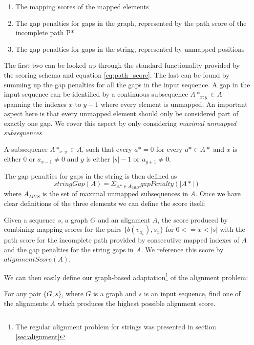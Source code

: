 \documentclass[thesis.tex]{subfiles}
\begin{document}
{\begin{enumerate}
  \item The mapping scores of the mapped elements
  \item The gap penalties for gaps in the graph, represented by the path score of the incomplete path P*
  \item The gap penalties for gaps in the string, represented by unmapped positions
\end{enumerate}
The first two can be looked up through the standard functionality provided by the scoring schema and equation \ref{eq:path_score}. The last can be found by summing up the gap penalties for all the gaps in the input sequence. A gap in the input sequence can be identified by a continuous subsequence $A*_{x:y} \in A$ spanning the indexes $x$ to $y-1$ where every element is unmapped. An important aspect here is that every unmapped element should only be considered part of exactly one gap. We cover this aspect by only considering \textit{maximal unmapped subsequences}
\begin{defn}
  A subsequence $A*_{x:y} \in A$, such that every $a*=0$ for every $a* \in A*$ and $x$ is either $0$ or $a_{x-1} \neq 0$ and $y$ is either $|s|-1$ or $a_{y+1} \neq 0$.
\end{defn}
The gap penalties for gaps in the string is then defined as 
\begin{equation}
  stringGap(A)=\Sigma_{A* \in A_{MUS}} gapPenalty(|A*|)
\end{equation}
where $A_{MUS}$ is the set of maximal unmapped subsequences in $A$. Once we have clear definitions of the three elements we can define the score itself:
\begin{defn}
  Given a sequence $s$, a graph $G$ and an alignment $A$, the score produced by combining mapping scores for the pairs $\{b(v_{a_x}), s_x\}$ for $0<=x<|s|$ with the path score for the incomplete path provided by consecutive mapped indexes of $A$ and the gap penalties for the string gaps in $A$. We reference this score by $alignmentScore(A)$.
\end{defn}
We can then easily define our graph-based adaptation\footnote{The regular alignment problem for strings was presented in section \ref{sec:alignment}} of the alignment problem:
\begin{defn}
  For any pair $\{G, s\}$, where $G$ is a graph and $s$ is an input sequence, find one of the alignments $A$ which produces the highest possible alignment score.

\end{defn}}
\end{document}
